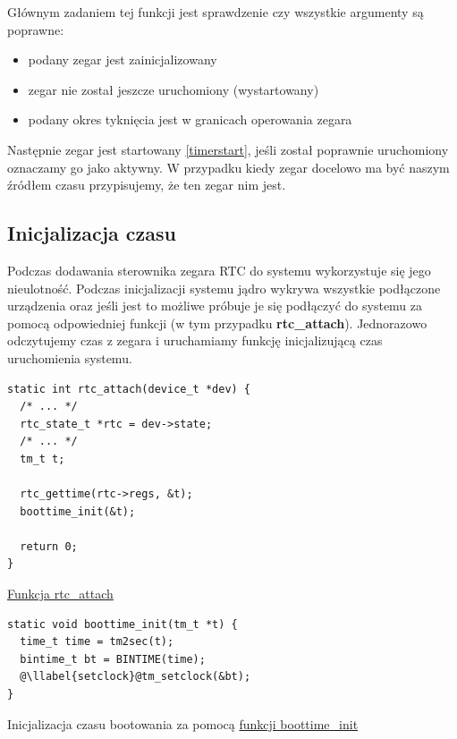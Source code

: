 \documentclass[shortabstract]{iithesis}
\makeatletter
\theoremstyle{definition} \newtheorem*{definition}{Definicja}
\theoremstyle{definition} \newtheorem*{example}{Przykład}
\theoremstyle{definition} \newtheorem*{remark}{Uwaga}
\newenvironment{longlisting}{\captionsetup{type=listing}}{}
\newcounter{llabel}[listing]%
\renewcommand*{\thellabel}{%
    \ifnum\value{llabel}<0 %
      \@ctrerr
    \else
      \ifnum\value{llabel}>10 %
        \@ctrerr
      \else
        \protect\ding{\the\numexpr\value{llabel}+201\relax}%
      \fi
    \fi
  }%
\newlength{\llabelsep}
\newcommand*{\llabel}[1]{%
  \begingroup
  \refstepcounter{llabel}%
  \label{#1}%
  \llap{\thellabel\kern\llabelsep}%
  \endgroup
}
\makeatother
\begin{document}
Głównym zadaniem tej funkcji jest sprawdzenie czy wszystkie argumenty są poprawne:
\begin{itemize}
    \item podany zegar jest zainicjalizowany
    \item zegar nie został jeszcze uruchomiony (wystartowany)
    \item podany okres tyknięcia jest w granicach operowania zegara
\end{itemize}

Następnie zegar jest startowany \ref{timerstart}, jeśli został poprawnie uruchomiony oznaczamy go jako aktywny. W przypadku kiedy zegar docelowo ma być naszym źródłem czasu przypisujemy, że ten zegar nim jest.


\subsection{Inicjalizacja czasu}
Podczas dodawania sterownika zegara RTC do systemu wykorzystuje się jego nieulotność. Podczas inicjalizacji systemu jądro wykrywa wszystkie podłączone urządzenia oraz jeśli jest to możliwe próbuje je się podłączyć do systemu za pomocą odpowiedniej funkcji (w tym przypadku \textbf{rtc\_attach}). Jednorazowo odczytujemy czas z zegara i uruchamiamy funkcję inicjalizującą czas uruchomienia systemu.

\begin{longlisting}
  \begin{verbatim}
static int rtc_attach(device_t *dev) {
  /* ... */
  rtc_state_t *rtc = dev->state;
  /* ... */
  tm_t t;
  
  rtc_gettime(rtc->regs, &t);
  boottime_init(&t);

  return 0;
}
  \end{verbatim}
  \caption{\href{https://mimiker.ii.uni.wroc.pl/source/xref/mimiker/sys/drv/rtc.c?r=825ac182\#97}{Funkcja rtc\_attach}}
  \label{lst:funcrtcattach}
\end{longlisting}

\begin{longlisting}
  \begin{verbatim}
static void boottime_init(tm_t *t) {
  time_t time = tm2sec(t);
  bintime_t bt = BINTIME(time);
  @\llabel{setclock}@tm_setclock(&bt);
}
  \end{verbatim}
  \caption{Inicjalizacja czasu bootowania za pomocą \href{https://mimiker.ii.uni.wroc.pl/source/xref/mimiker/sys/drv/rtc.c?r=825ac182\#38}{funkcji boottime\_init}}
  \label{lst:funcboottime}
\end{longlisting}
\end{document}
